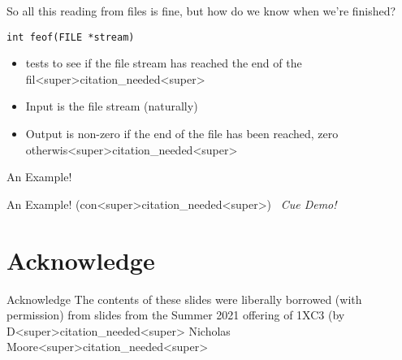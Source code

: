 \documentclass[11pt]{beamer}
\let\OldTexttt\texttt
\renewcommand{\texttt}[1]{\OldTexttt{\color{teal}{#1}}}
\begin{document}
\begin{frame}[fragile=singleslide]{\texttt{feof()}}
So all this reading from files is fine, but how do we know when we're finished? 
\begin{lstlisting}[style=C]
int feof(FILE *stream)
\end{lstlisting}
\begin{itemize}
\item \texttt{feof()} tests to see if the file stream has reached the end of the fil<super>citation_needed<super>
\item Input is the file stream (naturally)
\item Output is non-zero if the end of the file has been reached, zero otherwis<super>citation_needed<super>  
\end{itemize}
\end{frame}

\begin{frame}{An Example!}
\center
\
\end{frame}

\begin{frame}{An Example! (con<super>citation_needed<super>)}
\center
\
\emph{Cue Demo!}
\end{frame}


\section[Acknowledge]{Acknowledge}
\begin{frame}{Acknowledge}
\center
\vspace{8em}
The contents of these slides were liberally borrowed (with permission) from slides from the Summer 2021 offering of 1XC3 (by D<super>citation_needed<super> Nicholas Moore<super>citation_needed<super>  
\end{frame}
\end{document}
